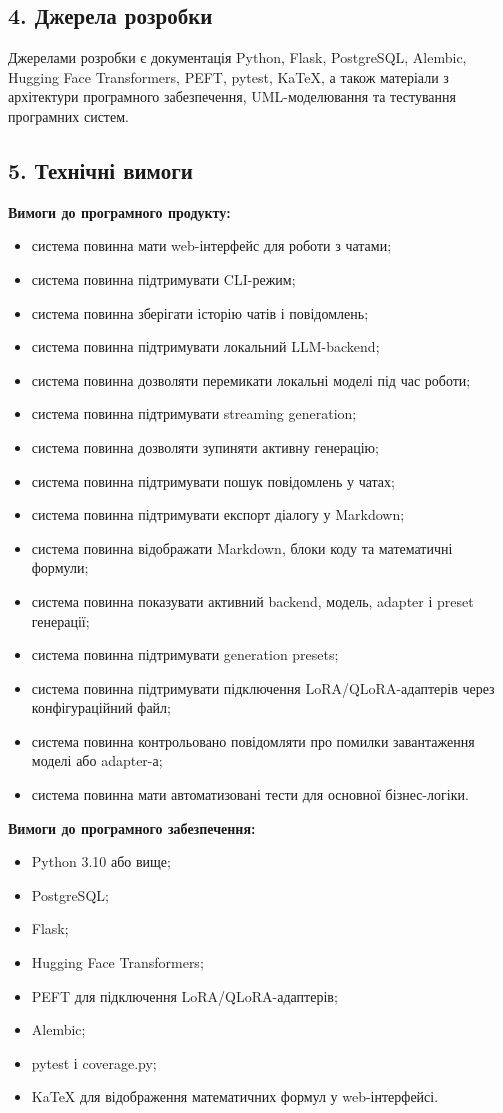 \subsection*{4. Джерела розробки}

Джерелами розробки є документація Python, Flask, PostgreSQL, Alembic, Hugging Face Transformers, PEFT, pytest, KaTeX, а також матеріали з архітектури програмного забезпечення, UML-моделювання та тестування програмних систем.

\subsection*{5. Технічні вимоги}

\textbf{Вимоги до програмного продукту:}
\begin{itemize}
  \item система повинна мати web-інтерфейс для роботи з чатами;
  \item система повинна підтримувати CLI-режим;
  \item система повинна зберігати історію чатів і повідомлень;
  \item система повинна підтримувати локальний LLM-backend;
  \item система повинна дозволяти перемикати локальні моделі під час роботи;
  \item система повинна підтримувати streaming generation;
  \item система повинна дозволяти зупиняти активну генерацію;
  \item система повинна підтримувати пошук повідомлень у чатах;
  \item система повинна підтримувати експорт діалогу у Markdown;
  \item система повинна відображати Markdown, блоки коду та математичні формули;
  \item система повинна показувати активний backend, модель, adapter і preset генерації;
  \item система повинна підтримувати generation presets;
  \item система повинна підтримувати підключення LoRA/QLoRA-адаптерів через конфігураційний файл;
  \item система повинна контрольовано повідомляти про помилки завантаження моделі або adapter-а;
  \item система повинна мати автоматизовані тести для основної бізнес-логіки.
\end{itemize}

\textbf{Вимоги до програмного забезпечення:}
\begin{itemize}
  \item Python 3.10 або вище;
  \item PostgreSQL;
  \item Flask;
  \item Hugging Face Transformers;
  \item PEFT для підключення LoRA/QLoRA-адаптерів;
  \item Alembic;
  \item pytest і coverage.py;
  \item KaTeX для відображення математичних формул у web-інтерфейсі.
\end{itemize}

